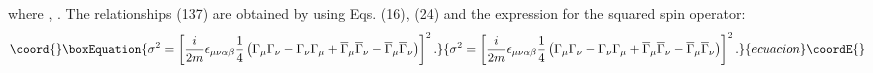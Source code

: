 \documentclass[a4paper,12pt]{article}
\begin{document}
where \coordHE{}  \coordHE{}  \coordHE{}, \coordHE{}. The relationships (137) are
obtained by using Eqs. (16), (24) and the expression for the
squared spin operator:
\begin{equation}\coord{}\boxEquation{
\sigma ^2=\left[ \frac i{2m}\epsilon _{\mu \nu \alpha \beta }\frac
14\left( \Gamma _\mu \Gamma _\nu -\Gamma _\nu \Gamma _\mu
+\overline{\Gamma }_\mu \overline{\Gamma }_\nu -\overline{\Gamma
}_\mu \overline{\Gamma }_\nu \right) \right] ^2  .\label{138}
}{
\sigma ^2=\left[ \frac i{2m}\epsilon _{\mu \nu \alpha \beta }\frac
14\left( \Gamma _\mu \Gamma _\nu -\Gamma _\nu \Gamma _\mu
+\overline{\Gamma }_\mu \overline{\Gamma }_\nu -\overline{\Gamma
}_\mu \overline{\Gamma }_\nu \right) \right] ^2  .}{ecuacion}\coordE{}\end{equation}
\end{document}
